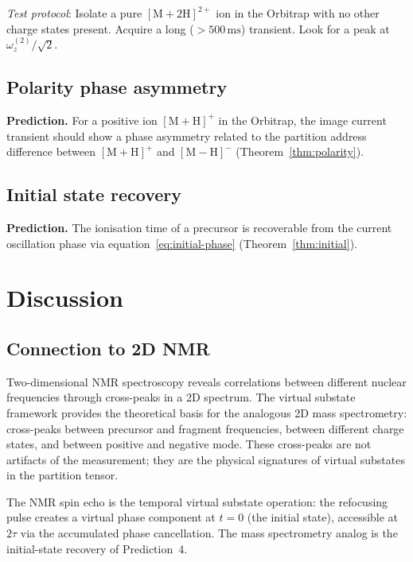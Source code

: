 \documentclass[twocolumn,10pt,a4paper]{article}
\theoremstyle{thmstyle}
\theoremstyle{definition}
\theoremstyle{remark}
\begin{document}
\textit{Test protocol}: Isolate a pure $[\mathrm{M+2H}]^{2+}$ ion in
the Orbitrap with no other charge states present. Acquire a long
($>500\,\mathrm{ms}$) transient. Look for a peak at $\omega_z^{(2)}/\sqrt{2}$.

\subsection{Polarity phase asymmetry}

\textbf{Prediction.} For a positive ion $[\mathrm{M+H}]^+$ in the
Orbitrap, the image current transient should show a phase asymmetry
related to the partition address difference between $[\mathrm{M+H}]^+$
and $[\mathrm{M-H}]^-$ (Theorem~\ref{thm:polarity}).

\subsection{Initial state recovery}

\textbf{Prediction.} The ionisation time of a precursor is recoverable
from the current oscillation phase via equation~\eqref{eq:initial-phase}
(Theorem~\ref{thm:initial}).

\section{Discussion}
\label{sec:discussion}

\subsection{Connection to 2D NMR}

Two-dimensional NMR spectroscopy \citep{jeener1979,ernst1987} reveals
correlations between different nuclear frequencies through cross-peaks
in a 2D spectrum. The virtual substate framework provides the theoretical
basis for the analogous 2D mass spectrometry: cross-peaks between
precursor and fragment frequencies, between different charge states, and
between positive and negative mode. These cross-peaks are not artifacts
of the measurement; they are the physical signatures of virtual substates
in the partition tensor.

The NMR spin echo \citep{hahn1950} is the temporal virtual substate
operation: the refocusing pulse creates a virtual phase component at
$t = 0$ (the initial state), accessible at $2\tau$ via the accumulated
phase cancellation. The mass spectrometry analog is the initial-state
recovery of Prediction~4.
\end{document}

